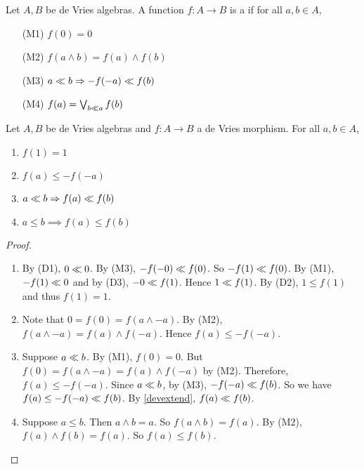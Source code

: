 
\begin{definition}
	Let \( A,B \) be de Vries algebras.  A function \( f:A \to B \) is a  if for all \( a,b \in A \),
	\begin{enumerate}
		\item[(M1)] \( f(0) = 0 \)
		\item[(M2)] \( f(a \wedge b) = f(a) \wedge f(b) \)
		\item[(M3)] \( a \ll b \Rightarrow -f(-a) \ll f(b) \)
		\item[(M4)] \( f(a) = \bigvee_{b \ll a} f(b) \)
	\end{enumerate}
\end{definition}

\begin{proposition}
	Let \( A,B \) be de Vries algebras and \( f:A \to B \) a de Vries morphism.  For all \( a,b \in A \),
	\begin{enumerate}[label={(\arabic*)},ref={\theproposition(\arabic*)}]
		\item \label{m11}
			\( f(1) = 1 \)
		\item \label{minverse}
			\( f(a) \leq -f(-a) \)
		\item \label{mdev}
			\( a \ll b \Rightarrow f(a) \ll f(b) \)
		\item \label{mleq}
			\( a \leq b \implies f(a) \leq f(b) \)
	\end{enumerate}
\end{proposition}
\begin{proof}
	\leavevmode
	\begin{enumerate}
		\item
			By (D1), \( 0 \ll 0 \).  By (M3), \( -f(-0) \ll f(0) \).  So \( -f(1) \ll f(0) \).  By (M1), \( -f(1) \ll 0 \) and by (D3), \( -0 \ll f(1) \).  Hence \( 1 \ll f(1) \).  By (D2), \( 1 \leq f(1) \) and thus \( f(1) = 1 \).
		\item
			Note that \( 0 = f(0) = f(a \wedge -a) \).  By (M2), \( f(a \wedge -a) = f(a) \wedge f(-a) \).  Hence \( f(a) \leq -f(-a) \).
		\item
			Suppose \( a \ll b \).  By (M1), \( f(0) = 0 \).  But \( f(0) = f(a \wedge -a) = f(a) \wedge f(-a) \) by (M2).  Therefore, \( f(a) \leq -f(-a) \).  Since \( a \ll b \), by (M3), \( -f(-a) \ll f(b) \).  So we have \( f(a) \leq -f(-a) \ll f(b) \).  By \ref{devextend}, \( f(a) \ll f(b) \).
		\item
			Suppose \( a \leq b \).  Then \( a \wedge b = a \).  So \( f(a \wedge b) = f(a) \).  By (M2), \( f(a) \wedge f(b) = f(a) \).  So \( f(a) \leq f(b) \).
	\end{enumerate}
\end{proof}

